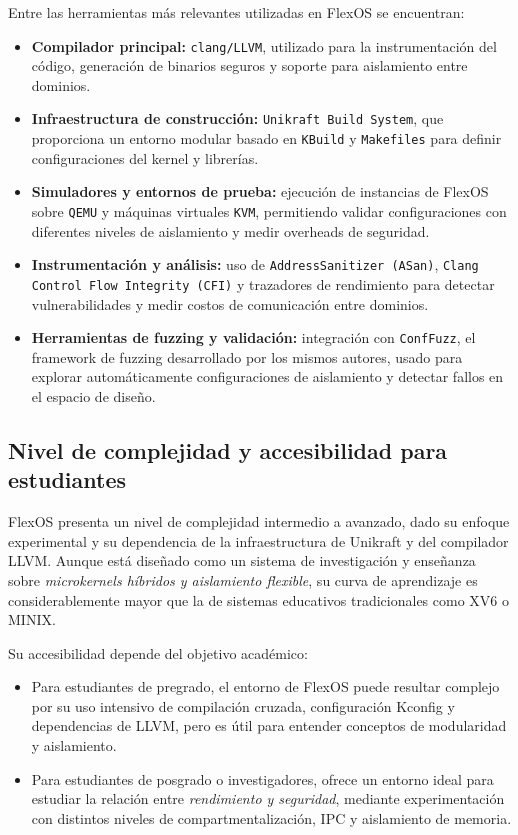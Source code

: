Entre las herramientas más relevantes utilizadas en FlexOS se encuentran:

\begin{itemize}
    \item \textbf{Compilador principal:} \texttt{clang/LLVM}, utilizado para la instrumentación del código, generación de binarios seguros y soporte para aislamiento entre dominios.
    \item \textbf{Infraestructura de construcción:} \texttt{Unikraft Build System}, que proporciona un entorno modular basado en \texttt{KBuild} y \texttt{Makefiles} para definir configuraciones del kernel y librerías.
    \item \textbf{Simuladores y entornos de prueba:} ejecución de instancias de FlexOS sobre \texttt{QEMU} y máquinas virtuales \texttt{KVM}, permitiendo validar configuraciones con diferentes niveles de aislamiento y medir overheads de seguridad.
    \item \textbf{Instrumentación y análisis:} uso de \texttt{AddressSanitizer (ASan)}, \texttt{Clang Control Flow Integrity (CFI)} y trazadores de rendimiento para detectar vulnerabilidades y medir costos de comunicación entre dominios.
    \item \textbf{Herramientas de fuzzing y validación:} integración con \texttt{ConfFuzz}, el framework de fuzzing desarrollado por los mismos autores, usado para explorar automáticamente configuraciones de aislamiento y detectar fallos en el espacio de diseño.
\end{itemize}

\subsection{Nivel de complejidad y accesibilidad para estudiantes}

FlexOS presenta un nivel de complejidad intermedio a avanzado, dado su enfoque experimental y su dependencia de la infraestructura de Unikraft y del compilador LLVM.  
Aunque está diseñado como un sistema de investigación y enseñanza sobre \textit{microkernels híbridos y aislamiento flexible}, su curva de aprendizaje es considerablemente mayor que la de sistemas educativos tradicionales como XV6 o MINIX.

Su accesibilidad depende del objetivo académico:

\begin{itemize}
    \item Para estudiantes de pregrado, el entorno de FlexOS puede resultar complejo por su uso intensivo de compilación cruzada, configuración Kconfig y dependencias de LLVM, pero es útil para entender conceptos de modularidad y aislamiento.
    \item Para estudiantes de posgrado o investigadores, ofrece un entorno ideal para estudiar la relación entre \textit{rendimiento y seguridad}, mediante experimentación con distintos niveles de compartmentalización, IPC y aislamiento de memoria.
\end{itemize}

